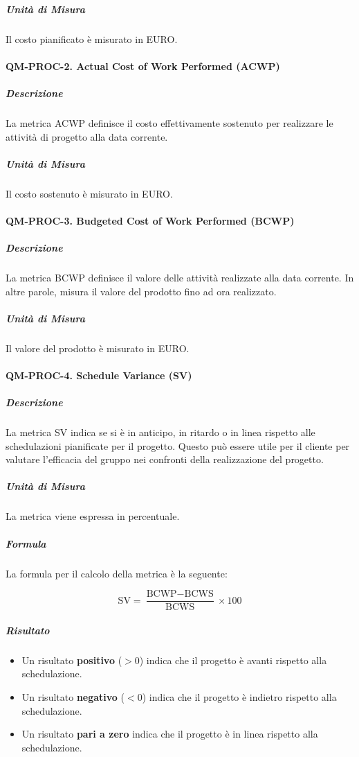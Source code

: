 			\subparagraph{Unità di Misura}
			Il costo pianificato è misurato in EURO.

		\paragraph{QM-PROC-2. Actual Cost of Work Performed (ACWP)}

			\subparagraph{Descrizione}
			La metrica ACWP definisce il costo effettivamente sostenuto per realizzare le attività di progetto alla data corrente.

			\subparagraph{Unità di Misura}
			Il costo sostenuto è misurato in EURO.

		\paragraph{QM-PROC-3. Budgeted Cost of Work Performed (BCWP)}

			\subparagraph{Descrizione}
			La metrica BCWP definisce il valore delle attività realizzate alla data corrente. In altre parole, misura il valore del prodotto fino ad ora realizzato.

			\subparagraph{Unità di Misura}
			Il valore del prodotto è misurato in EURO.

		\paragraph{QM-PROC-4. Schedule Variance (SV)}

			\subparagraph{Descrizione}
			La metrica SV indica se si è in anticipo, in ritardo o in linea rispetto alle schedulazioni pianificate per il progetto. Questo può essere utile per il cliente per valutare l'efficacia del gruppo nei confronti della realizzazione del progetto.

			\subparagraph{Unità di Misura}
			La metrica viene espressa in percentuale.

			\subparagraph{Formula}
			La formula per il calcolo della metrica è la seguente:

			\[
				\text{SV} = \frac{\text{BCWP} - \text{BCWS}}{\text{BCWS}} \times 100
			\]

			\subparagraph{Risultato}
			\begin{itemize}
				\item Un risultato \textbf{positivo} (\(> 0\)) indica che il progetto è avanti rispetto alla schedulazione.
				\item Un risultato \textbf{negativo} (\(< 0\)) indica che il progetto è indietro rispetto alla schedulazione.
				\item Un risultato \textbf{pari a zero} indica che il progetto è in linea rispetto alla schedulazione.
			\end{itemize}

